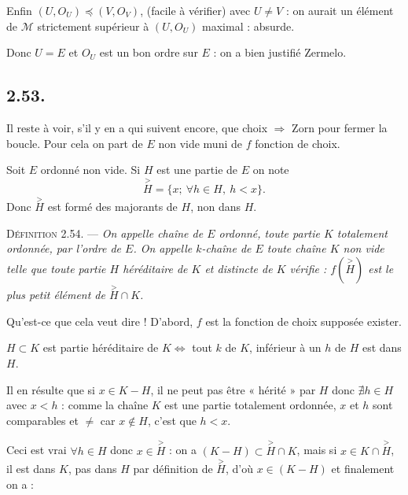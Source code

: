 Enfin $(U,O_U)\preccurlyeq(V,O_V)$, (facile à vérifier) avec $U\ne V$ : on aurait un élément de $\mathcal M$ strictement supérieur à $(U,O_U)$ maximal : absurde.

Donc $U=E$ et $O_U$ est un bon ordre sur $E$ : on a bien justifié Zermelo. \bookend

\subsection*{2.53.}
Il reste à voir, s'il y en a qui suivent encore, que choix $\Rightarrow$ Zorn pour fermer la boucle. Pour cela on part de $E$ non vide muni de $f$ fonction de choix.

Soit $E$ ordonné non vide. Si $H$ est une partie de $E$ on note
\[
\overset{>}{H}=\{x;\ \forall h\in H,\ h<x\}.
\]
Donc $\overset{>}{H}$ est formé des majorants de $H$, non dans $H$.

\medskip\noindent\textsc{Définition 2.54.} --- \emph{On appelle chaîne de $E$ ordonné, toute partie $K$ totalement ordonnée, par l'ordre de $E$. On appelle $k$-chaîne de $E$ toute chaîne $K$ non vide telle que toute partie $H$ héréditaire de $K$ et distincte de $K$ vérifie : $f(\overset{>}{H})$ est le plus petit élément de $\overset{>}{H}\cap K$.}

Qu'est-ce que cela veut dire ! D'abord, $f$ est la fonction de choix supposée exister.

$H\subset K$ est partie héréditaire de $K\Leftrightarrow$ tout $k$ de $K$, inférieur à un $h$ de $H$ est dans $H$.

Il en résulte que si $x\in K-H$, il ne peut pas être « hérité » par $H$ donc $\nexists h\in H$ avec $x<h$ : comme la chaîne $K$ est une partie totalement ordonnée, $x$ et $h$ sont comparables et $\ne$ car $x\notin H$, c'est que $h<x$.

Ceci est vrai $\forall h\in H$ donc $x\in\overset{>}{H}$ : on a $(K-H)\subset\overset{>}{H}\cap K$, mais si $x\in K\cap\overset{>}{H}$, il est dans $K$, pas dans $H$ par définition de $\overset{>}{H}$, d'où $x\in(K-H)$ et finalement on a :

